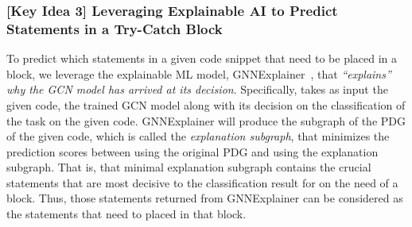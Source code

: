


\subsubsection{{\bf [Key Idea 3] Leveraging Explainable AI to Predict Statements in a Try-Catch Block}} To predict which statements in a given code snippet that need to be
placed in a  block, we leverage the explainable ML
model, GNNExplainer~\cite{GNNExplainer}, that {\em ``explains'' why
  the GCN model has arrived at its decision}. Specifically, {\tool}
takes as input the given code, the trained GCN model along with its
decision on the classification of the task {\xblock} on the given
code. GNNExplainer will produce the subgraph of the PDG of the given
code, which is called the {\em explanation subgraph}, that minimizes
the prediction scores between using the original PDG and using the
explanation subgraph. That is, that minimal explanation subgraph
contains the crucial statements that are most decisive to the
classification result for {\xblock} on the need of a 
block.  Thus, those statements returned from GNNExplainer can be
considered as the statements that need to placed in that
block.
